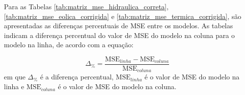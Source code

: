 \begin{table}[htb]
  \centering
\end{table}

Para as Tabelas \ref{tab:matriz_mse_hidraulica_correta}, \ref{tab:matriz_mse_eolica_corrigida} e \ref{tab:matriz_mse_termica_corrigida},
são apresentadas as diferenças percentuais de MSE entre os modelos. As tabelas indicam a diferença percentual do valor de
MSE do modelo na coluna para o modelo na linha, de acordo com a equação:

\begin{equation}
\Delta_\% = \frac{\text{MSE}_{linha} - \text{MSE}_{coluna}}{\text{MSE}_{coluna}}
\end{equation}
em que $\Delta_\%$ é a diferença percentual, $\text{MSE}_{linha}$ é o valor de MSE do modelo na linha e $\text{MSE}_{coluna}$ 
é o valor de MSE do modelo na coluna.

